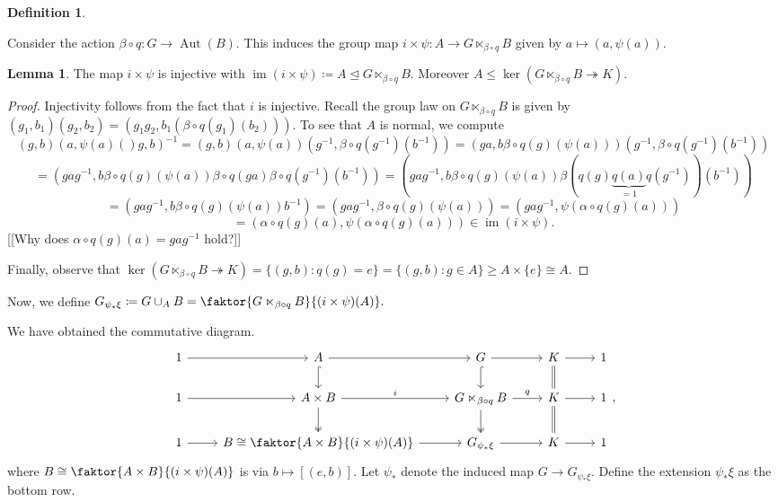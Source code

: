 \documentclass[10pt,letterpaper,cm]{nupset}
\theoremstyle{definition}
\newtheorem*{definition}{Definition}
\newtheorem{lemma}{Lemma}
\newcommand{\1}{\mathbf{1}}
\newcommand{\0}{\vec 0}
\DeclareMathOperator{\aut}{Aut}
\DeclareMathOperator{\im}{im}
\begin{document}
\begin{definition}
\begin{enumerate}
Consider the action $\beta \circ q : G \to \aut(B)$. This induces the group map $i \times \psi : A \to G \ltimes_{\beta \circ q} B$ given by $a \mapsto (a, \psi(a))$.
\begin{lemma}
The map $i \times \psi$ is injective with $\im (i \times \psi)\coloneqq  A \unlhd G \ltimes_{\beta \circ q} B$. Moreover $A \leq \ker (G\ltimes_{\beta \circ q} B \twoheadrightarrow K)$.
\end{lemma}
\begin{proof}
Injectivity follows from the fact that $i$ is injective. Recall the group law on $G \ltimes_{\beta \circ q} B$ is given by $(g_1, b_1)(g_2, b_2) = (g_1g_2, b_1(\beta \circ q(g_1)(b_2)))$. To see that $A$ is normal, we compute
$$(g, b)(a, \psi(a)()g,b)^{-1} = (g, b)(a, \psi(a) )(g^{-1}, \beta \circ q(g^{-1})(b^{-1})) = (ga, b\beta \circ q(g)(\psi(a)))(g^{-1}, \beta \circ q(g^{-1})(b^{-1}))$$ $$ = (gag^{-1}, b\beta \circ q(g)(\psi(a))\beta \circ q(ga)\beta \circ q(g^{-1})(b^{-1})) = (gag^{-1}, b\beta \circ q(g)(\psi(a)) \beta (q(g)\underbrace{q(a)}_{=1}q(g^{-1}))(b^{-1}))$$
$$=  (gag^{-1}, b\beta \circ q(g)(\psi(a))b^{-1}) = (gag^{-1}, \beta \circ q(g)(\psi(a))) = (gag^{-1}, \psi(\alpha \circ q(g)(a))) $$ $$ = (\alpha \circ q(g)(a),  \psi(\alpha \circ q(g)(a))) \in \im(i \times \psi).$$ {[[Why does $\alpha \circ q(g)(a) = gag^{-1}$ hold?]]}

Finally, observe that $\ker (G\ltimes_{\beta \circ q} B \twoheadrightarrow K) = \{(g, b) : q(g) =e\} = \{(g, b) : g \in A\} \geq A\times \{e\} \cong A$. 
\end{proof}
Now, we define $G_{\psi_{\ast}\xi} \coloneqq  G \cup_A B = \faktor{G\ltimes_{\beta \circ q} B}{(i\times \psi)(A)}.$ 

We have obtained the commutative diagram.
\[
\begin{tikzcd}
1 \arrow[r] & A \arrow[d, hook] \arrow[r] & G \arrow[d, hook] \arrow[r] & K \arrow[d, equal] \arrow[r] & 1 \\
1 \arrow[r] & A\times B \arrow[r, "i"] \arrow[d, two heads] & G \ltimes_{\beta \circ q} B \arrow[r, "q"] \arrow[d, two heads] & K \arrow[r] \arrow[d, equal] & 1 \\
1 \arrow[r] & B \cong \faktor{A\times B}{(i\times \psi)(A)} \arrow[r] & G_{\psi_{\ast}\xi} \arrow[r] & K \arrow[r] & 1
\end{tikzcd},
\]
where $B \cong \faktor{A\times B}{(i\times \psi)(A)}$ is via  $b \mapsto [(e, b)]$. Let $\psi_{\ast}$ denote the induced map $G \to G_{\psi_{\ast} \xi}$. Define the extension $\psi_{\ast}\xi$ as the bottom row.


\end{enumerate}
\end{definition}
\end{document}
